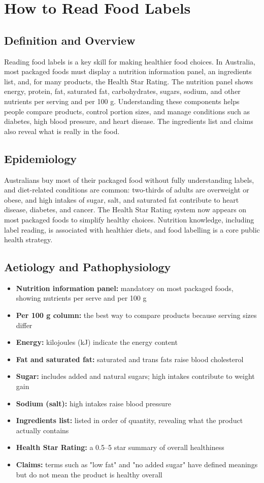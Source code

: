 \chapter{How to Read Food Labels}

\section*{Definition and Overview}
Reading food labels is a key skill for making healthier food choices. In Australia, most packaged foods must display a nutrition information panel, an ingredients list, and, for many products, the Health Star Rating. The nutrition panel shows energy, protein, fat, saturated fat, carbohydrates, sugars, sodium, and other nutrients per serving and per 100 g. Understanding these components helps people compare products, control portion sizes, and manage conditions such as diabetes, high blood pressure, and heart disease. The ingredients list and claims also reveal what is really in the food.

\section*{Epidemiology}
Australians buy most of their packaged food without fully understanding labels, and diet-related conditions are common: two-thirds of adults are overweight or obese, and high intakes of sugar, salt, and saturated fat contribute to heart disease, diabetes, and cancer. The Health Star Rating system now appears on most packaged foods to simplify healthy choices. Nutrition knowledge, including label reading, is associated with healthier diets, and food labelling is a core public health strategy.

\section*{Aetiology and Pathophysiology}
\begin{itemize}
    \item \textbf{Nutrition information panel:} mandatory on most packaged foods, showing nutrients per serve and per 100 g
    \item \textbf{Per 100 g column:} the best way to compare products because serving sizes differ
    \item \textbf{Energy:} kilojoules (kJ) indicate the energy content
    \item \textbf{Fat and saturated fat:} saturated and trans fats raise blood cholesterol
    \item \textbf{Sugar:} includes added and natural sugars; high intakes contribute to weight gain
    \item \textbf{Sodium (salt):} high intakes raise blood pressure
    \item \textbf{Ingredients list:} listed in order of quantity, revealing what the product actually contains
    \item \textbf{Health Star Rating:} a 0.5--5 star summary of overall healthiness
    \item \textbf{Claims:} terms such as "low fat" and "no added sugar" have defined meanings but do not mean the product is healthy overall
\end{itemize}

